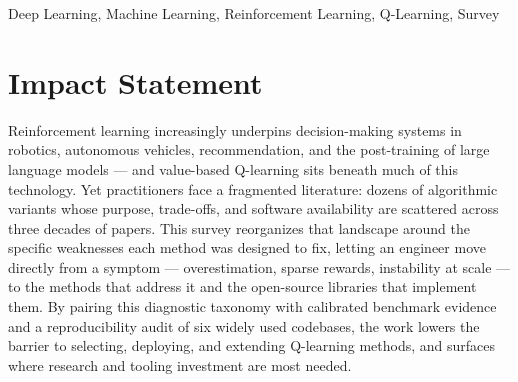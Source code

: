 \documentclass[journal]{IEEEtran}
\begin{document}
\begin{IEEEkeywords}
Deep Learning, Machine Learning, Reinforcement Learning, Q-Learning, Survey
\end{IEEEkeywords}

\IEEEpeerreviewmaketitle

\section*{Impact Statement}
Reinforcement learning increasingly underpins decision-making systems in
robotics, autonomous vehicles, recommendation, and the post-training of large
language models --- and value-based Q-learning sits beneath much of this
technology. Yet practitioners face a fragmented literature: dozens of
algorithmic variants whose purpose, trade-offs, and software availability are
scattered across three decades of papers. This survey reorganizes that
landscape around the specific weaknesses each method was designed to fix,
letting an engineer move directly from a symptom --- overestimation, sparse
rewards, instability at scale --- to the methods that address it and the
open-source libraries that implement them. By pairing this diagnostic taxonomy
with calibrated benchmark evidence and a reproducibility audit of six widely
used codebases, the work lowers the barrier to selecting, deploying, and
extending Q-learning methods, and surfaces where research and tooling
investment are most needed.





\end{document}

